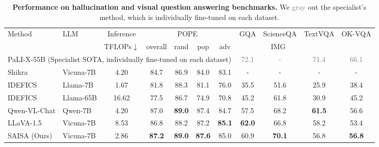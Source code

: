 \begin{table*}[t]
  \centering
  {
  \renewcommand{\arraystretch}{1.0}
  \scalebox{0.95}
  { 
 \begin{tabular}{ll|c|cccc|cccc}
    \toprule
    \multirow{2}[2]{*}{Method} & \multirow{2}[2]{*}{LLM}  & Inference & \multicolumn{4}{c|}{POPE~\cite{li2023evaluatingobjecthallucinationlarge}}  & GQA & ScienceQA  & TextVQA & OK-VQA \\
          &        & TFLOPs$\downarrow$ & overall & rand & pop & adv      & \cite{hudson2019gqanewdatasetrealworld}      & IMG~\cite{lu2022learnexplainmultimodalreasoning}  & \cite{singh2019vqamodelsread} &  \cite{marino2019okvqavisualquestionanswering} \\
    \midrule
    \multicolumn{7}{l|}{\color{gray} PaLI-X-55B (Specialist SOTA, individually fine-tuned on each dataset) }                       & \textcolor{gray}{72.1} & \textcolor{gray}{-}  & \textcolor{gray}{71.4} & \textcolor{gray}{66.1}  \\
    \midrule
    Shikra & Vicuna-7B   & 4.20  & 84.7  & 86.9  & 84.0  & 83.1  & -     & -     & -     & - \\
    IDEFICS & Llama-7B   & 1.67  & 81.8  & 88.3  & 81.1  & 76.0    & 35.5  & 51.6  & 25.9 & 38.4 \\
    IDEFICS & Llama-65B   & 16.62 & 77.5  & 86.7  & 74.9  & 70.8    & 45.2  & 61.8  & 30.9 & 45.2 \\
    Qwen-VL-Chat & Qwen-7B   & 4.20  & 87.0  & \textbf{89.0} & 87.4  & 84.7    & 57.5  & 68.2  & \textbf{61.5} & 56.6 \\
    LLaVA-1.5 & Vicuna-7B   & 8.53  & 86.8  & 88.2  & 87.2  & \textbf{85.1}   & \textbf{62.0} & 66.8  & 58.2 & 53.4 \\
    \rowcolor{cyan!20} SAISA (Ours) & Vicuna-7B   & 2.86  & \textbf{87.2} & \textbf{89.0} & \textbf{87.6} & 85.0   & 60.9  & \textbf{70.1}  & 56.8 & \textbf{56.8} \\
    \bottomrule
    \end{tabular}
    }
  }
  \caption{
  \textbf{Performance on hallucination and visual question answering benchmarks.}
  We \textcolor{gray}{gray} out the specialist's method, which is individually fine-tuned on each dataset.
  }
  \label{tab:vqa}
\end{table*}